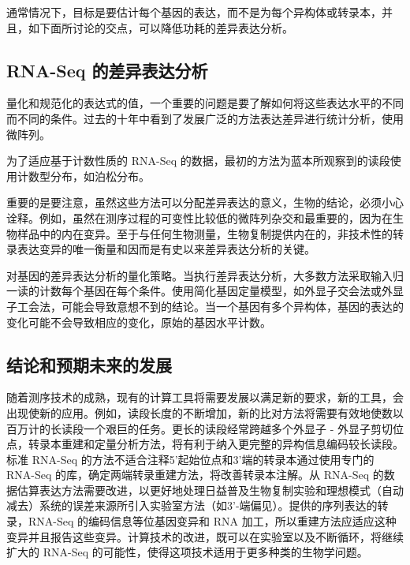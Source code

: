 通常情况下，目标是要估计每个基因的表达，而不是为每个异构体或转录本，并且，如下面所讨论的交点，可以降低功耗的差异表达分析。

\subsection{RNA-Seq 的差异表达分析}

量化和规范化的表达式的值，一个重要的问题是要了解如何将这些表达水平的不同而不同的条件。过去的十年中看到了发展广泛的方法表达差异进行统计分析，使用微阵列。

为了适应基于计数性质的 RNA-Seq 的数据，最初的方法为蓝本所观察到的读段使用计数型分布，如泊松分布。

重要的是要注意，虽然这些方法可以分配差异表达的意义，生物的结论，必须小心诠释。例如，虽然在测序过程的可变性比较低的微阵列杂交和最重要的，因为在生物样品中的内在变异。至于与任何生物测量，生物复制提供内在的，非技术性的转录表达变异的唯一衡量和因而是有史以来差异表达分析的关键。

对基因的差异表达分析的量化策略。当执行差异表达分析，大多数方法采取输入归一读的计数每个基因在每个条件。使用简化基因定量模型，如外显子交会法或外显子工会法，可能会导致意想不到的结论。当一个基因有多个异构体，基因的表达的变化可能不会导致相应的变化，原始的基因水平计数。

\subsection{结论和预期未来的发展}

随着测序技术的成熟，现有的计算工具将需要发展以满足新的要求，新的工具，会出现使新的应用。例如，读段长度的不断增加，新的比对方法将需要有效地使数以百万计的长读段一个艰巨的任务。更长的读段经常跨越多个外显子 - 外显子剪切位点，转录本重建和定量分析方法，将有利于纳入更完整的异构信息编码较长读段。标准 RNA-Seq 的方法不适合注释5'起始位点和3'端的转录本通过使用专门的 RNA-Seq 的库，确定两端转录重建方法，将改善转录本注解。从 RNA-Seq 的数据估算表达方法需要改进，以更好地处理日益普及生物复制实验和理想模式（自动减去）系统的误差来源所引入实验室方法（如3'-端偏见）。提供的序列表达的转录，RNA-Seq 的编码信息等位​​基因变异和 RNA 加工，所以重建方法应适应这种变异并且报告这些变异。计算技术的改进，既可以在实验室以及不断循环，将继续扩大的 RNA-Seq 的可能性，使得这项技术适用于更多种类的生物学问题。






